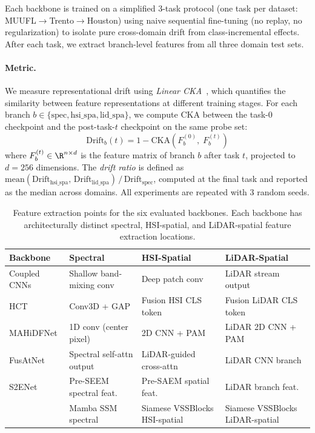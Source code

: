 Each backbone is trained on a simplified 3-task protocol (one task per dataset: MUUFL$\to$Trento$\to$Houston) using naive sequential fine-tuning (no replay, no regularization) to isolate pure cross-domain drift from class-incremental effects.
After each task, we extract branch-level features from all three domain test sets.

\paragraph{Metric.}
We measure representational drift using \emph{Linear CKA}~\cite{kornblith2019cka}, which quantifies the similarity between feature representations at different training stages.
For each branch $b \in \{\mathrm{spec}, \mathrm{hsi\_spa}, \mathrm{lid\_spa}\}$, we compute CKA between the task-0 checkpoint and the post-task-$t$ checkpoint on the same probe set:
\begin{equation}
    \mathrm{Drift}_b(t) = 1 - \mathrm{CKA}\!\left(F_b^{(0)},\; F_b^{(t)}\right)
\label{eq:drift_cka}
\end{equation}
where $F_b^{(t)} \in \R^{n \times d}$ is the feature matrix of branch $b$ after task $t$, projected to $d{=}256$ dimensions.
The \emph{drift ratio} is defined as $\mathrm{mean}(\mathrm{Drift}_{\mathrm{hsi\_spa}},\, \mathrm{Drift}_{\mathrm{lid\_spa}}) \,/\, \mathrm{Drift}_{\mathrm{spec}}$, computed at the final task and reported as the median across domains.
All experiments are repeated with 3 random seeds.

\begin{table}[t]
\centering
\caption{Feature extraction points for the six evaluated backbones. Each backbone has architecturally distinct spectral, HSI-spatial, and LiDAR-spatial feature extraction locations.}
\label{tab:backbones}
\small
\begin{tabular}{p{1.5cm}p{1.8cm}p{1.8cm}p{1.8cm}}
\toprule
Backbone & Spectral & HSI-Spatial & LiDAR-Spatial \\
\midrule
Coupled CNNs & Shallow band-mixing conv & Deep patch conv & LiDAR stream output \\
HCT & Conv3D + GAP & Fusion HSI CLS token & Fusion LiDAR CLS token \\
MAHiDFNet & 1D conv (center pixel) & 2D CNN + PAM & LiDAR 2D CNN + PAM \\
FusAtNet & Spectral self-attn output & LiDAR-guided cross-attn & LiDAR CNN branch \\
S2ENet & Pre-SEEM spectral feat. & Pre-SAEM spatial feat. & LiDAR branch feat. \\
\backbonename{} & Mamba SSM spectral & Siamese VSSBlocks HSI-spatial & Siamese VSSBlocks LiDAR-spatial \\
\bottomrule
\end{tabular}
\end{table}

